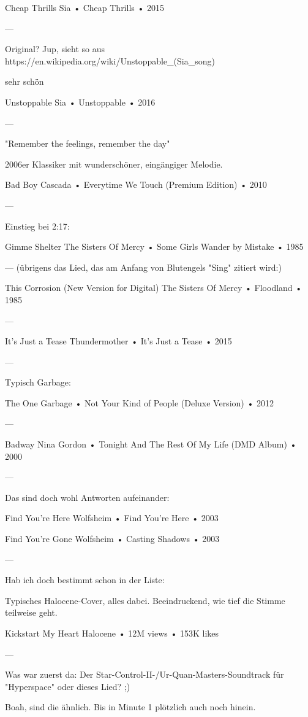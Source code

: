 Cheap Thrills
Sia
 •
Cheap Thrills
 •
2015


—

Original?
Jup, sieht so aus
https://en.wikipedia.org/wiki/Unstoppable_(Sia_song)

sehr schön

Unstoppable
Sia
 •
Unstoppable
 •
2016


—

"Remember the feelings, remember the day"

2006er Klassiker mit wunderschöner, eingängiger Melodie.

Bad Boy
Cascada
 •
Everytime We Touch (Premium Edition)
 •
2010

—

Einstieg bei 2:17:

Gimme Shelter
The Sisters Of Mercy
 •
Some Girls Wander by Mistake
 •
1985

—
(übrigens das Lied, das am Anfang von Blutengels "Sing" zitiert wird:)

This Corrosion (New Version for Digital)
The Sisters Of Mercy
 •
Floodland
 •
1985


—

It's Just a Tease
Thundermother
 •
It's Just a Tease
 •
2015

—

Typisch Garbage:

The One
Garbage
 •
Not Your Kind of People (Deluxe Version)
 •
2012


—

Badway
Nina Gordon
 •
Tonight And The Rest Of My Life (DMD Album)
 •
2000

—

Das sind doch wohl Antworten aufeinander:

Find You're Here
Wolfsheim
 •
Find You're Here
 •
2003


Find You're Gone
Wolfsheim
 •
Casting Shadows
 •
2003

—

Hab ich doch bestimmt schon in der Liste:

Typisches Halocene-Cover, alles dabei. Beeindruckend, wie tief die Stimme teilweise geht.

Kickstart My Heart
Halocene
 •
12M views
 •
153K likes


—

Was war zuerst da: Der Star-Control-II-/Ur-Quan-Masters-Soundtrack für "Hyperspace" oder dieses Lied? ;)

Boah, sind die ähnlich. Bis in Minute 1 plötzlich auch noch hinein.

